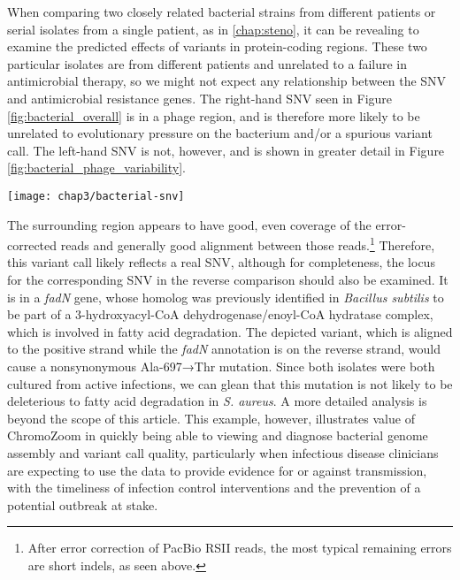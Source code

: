 When comparing two closely related bacterial strains from different patients or serial isolates from a single patient, as in \autoref{chap:steno}, it can be revealing to examine the predicted effects of variants in protein-coding regions. These two particular isolates are from different patients and unrelated to a failure in antimicrobial therapy, so we might not expect any relationship between the SNV and antimicrobial resistance genes. The right-hand SNV seen in Figure \ref{fig:bacterial_overall} is in a phage region, and is therefore more likely to be unrelated to evolutionary pressure on the bacterium and/or a spurious variant call. The left-hand SNV is not, however, and is shown in greater detail in Figure \ref{fig:bacterial_phage_variability}.
\begin{figure*}
  \texttt{[image: chap3/bacterial-snv]}               
  \caption[A SNV between the two \emph{S. aureus} strains is in \emph{fadN}]{A SNV between the two \emph{S. aureus} strains is in \emph{fadN}, which putatively encodes a 3-hydroxyacyl-CoA dehydrogenase. Note that \emph{fadN} is on the negative strand while the SNV annotation (top track) is relative to the positive strand.}
  \label{fig:bacterial_phage_variability}
\end{figure*}
The surrounding region appears to have good, even coverage of the error-corrected reads and generally good alignment between those reads.\footnote[][1cm]{After error correction of PacBio RSII reads, the most typical remaining errors are short indels, as seen above.} Therefore, this variant call likely reflects a real SNV, although for completeness, the locus for the corresponding SNV in the reverse comparison should also be examined. It is in a \emph{fadN} gene, whose homolog was previously identified in \emph{Bacillus subtilis} to be part of a 3-hydroxyacyl-CoA dehydrogenase/enoyl-CoA hydratase complex, which is involved in fatty acid degradation.\autocite{Matsuoka2007} The depicted variant, which is aligned to the positive strand while the \emph{fadN} annotation is on the reverse strand, would cause a nonsynonymous Ala-697→Thr mutation. Since both isolates were both cultured from active infections, we can glean that this mutation is not likely to be deleterious to fatty acid degradation in \emph{S. aureus}. A more detailed analysis is beyond the scope of this article. This example, however, illustrates value of ChromoZoom in quickly being able to viewing and diagnose bacterial genome assembly and variant call quality, particularly when infectious disease clinicians are expecting to use the data to provide evidence for or against transmission, with the timeliness of infection control interventions and the prevention of a potential outbreak at stake.

